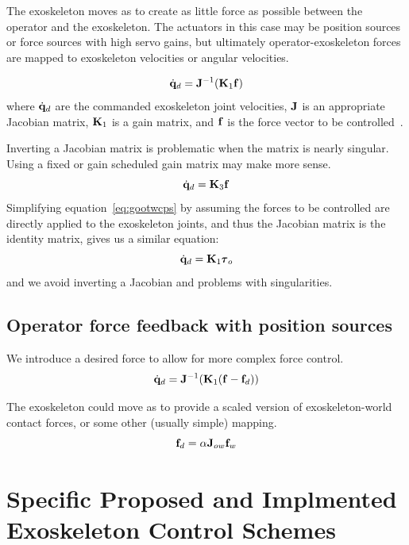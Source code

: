 \documentclass[letterpaper,12pt,fullpage]{article}
\begin{document}
The exoskeleton moves as to create as little force as possible between the
operator and the exoskeleton. The actuators in this case may be position sources or
force sources with high servo gains,
but ultimately operator-exoskeleton forces are mapped
to exoskeleton velocities or angular velocities.

\begin{equation}
\dot{{\bf q}}_d = {\bf J}^{-1} ({\bf K}_1 {\bf f})
\label{eq:gootwcps}
\end{equation}
where $\dot{{\bf q}}_d$ are the commanded exoskeleton joint velocities,
${\bf J}$ is an appropriate Jacobian matrix, ${\bf K}_1$ is a gain matrix,
and ${\bf f}$ is the force vector to be controlled~\cite{IEEE06990981}.

Inverting a Jacobian matrix is problematic when the matrix is
nearly singular.
Using a fixed or gain scheduled gain matrix may make more sense.
\begin{equation}
\dot{{\bf q}}_d = {\bf K}_3 {\bf f}
\end{equation}
Simplifying equation~\ref{eq:gootwcps}
by assuming the forces to be controlled
are directly applied to the exoskeleton joints, and thus the Jacobian matrix
is the identity matrix, gives us a similar equation:
\begin{equation}
\dot{\vq}_d = \mK_1 \vtau_o
\end{equation}
and we avoid inverting a Jacobian and problems with singularities.

\subsection{Operator force feedback with position sources}

We introduce a desired force to allow for more complex force control.
\begin{equation}
\dot{{\bf q}}_d = {\bf J}^{-1} ({\bf K}_1 ({\bf f} - {\bf f}_d))
\end{equation}

The exoskeleton could move as to provide a scaled version of exoskeleton-world
contact forces, or some other (usually simple) mapping. 
\begin{equation}
{\bf f}_d = \alpha {\bf J}_{ow} {\bf f}_w
\end{equation}

\section{Specific Proposed and Implmented Exoskeleton Control Schemes}
\end{document}
